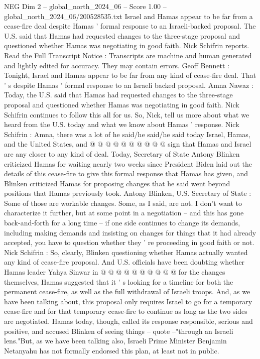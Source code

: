 \begin{textsample}{NEG Dim 2 – global\_north\_2024\_06 – Score 1.00 – global\_north\_2024\_06/200528535.txt}  \label{ex:f2_neg_198}
Israel and Hamas appear to be far from a cease-fire deal despite Hamas ' formal response to an Israeli-backed proposal.
The U.S. said that Hamas had requested changes to the three-stage proposal and questioned whether Hamas was negotiating in good faith.
Nick Schifrin reports.
Read the Full Transcript Notice : Transcripts are machine and human generated and lightly edited for accuracy.
They may contain errors.
Geoff Bennett : Tonight, Israel and Hamas appear to be far from any kind of cease-fire deal.
That ' s despite Hamas ' formal response to an Israeli backed proposal.
Amna Nawaz : Today, the U.S. said that Hamas had requested changes to the three-stage proposal and questioned whether Hamas was negotiating in good faith.
Nick Schifrin continues to follow this all for us.
So, Nick, tell us more about what we heard from the U.S. today and what we know about Hamas ' response.
Nick Schifrin : Amna, there was a lot of he said/he said/he said today Israel, Hamas, and the United States, and @ @ @ @ @ @ @ @ @ @ sign that Hamas and Israel are any closer to any kind of deal.
Today, Secretary of State Antony Blinken criticized Hamas for waiting nearly two weeks since President Biden laid out the details of this cease-fire to give this formal response that Hamas has given, and Blinken criticized Hamas for proposing changes that he said went beyond positions that Hamas previously took.
Antony Blinken, U.S.
Secretary of State : Some of those are workable changes.
Some, as I said, are not.
I don't want to characterize it further, but at some point in a negotiation -- and this has gone back-and-forth for a long time -- if one side continues to change its demands, including making demands and insisting on changes for things that it had already accepted, you have to question whether they ' re proceeding in good faith or not.
Nick Schifrin : So, clearly, Blinken questioning whether Hamas actually wanted any kind of cease-fire proposal.
And U.S. officials have been doubting whether Hamas leader Yahya Sinwar in @ @ @ @ @ @ @ @ @ @ for the changes themselves, Hamas suggested that it ' s looking for a timeline for both the permanent cease-fire, as well as the full withdrawal of Israeli troops.
And, as we have been talking about, this proposal only requires Israel to go for a temporary cease-fire and for that temporary cease-fire to continue as long as the two sides are negotiated.
Hamas today, though, called its response responsible, serious and positive, and accused Blinken of seeing things -- quote --"through an Israeli lens."But, as we have been talking also, Israeli Prime Minister Benjamin Netanyahu has not formally endorsed this plan, at least not in public.

\end{textsample}
